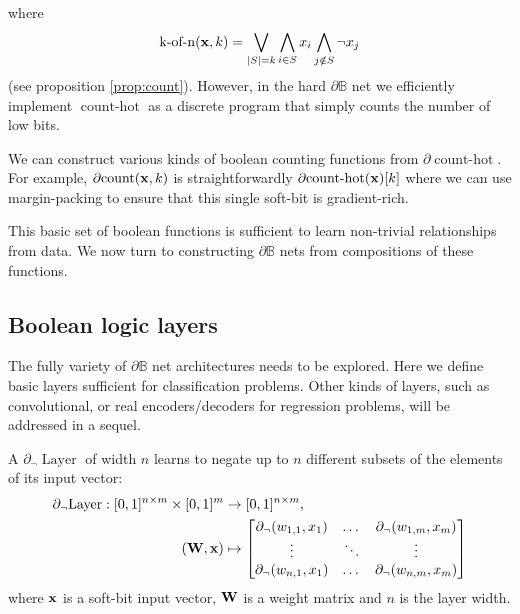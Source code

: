 \documentclass{article} %
\begin{document}
where
\begin{equation*}
\operatorname{k-of-n}({\bf x}, k) = \bigvee_{|S|=k} \bigwedge_{i\in S} x_i \bigwedge_{j\notin S} \neg x_j
\end{equation*}
(see proposition \ref{prop:count}). However, in the hard $\partial\mathbb{B}$ net we efficiently implement $\operatorname{count-hot}$ as a discrete program that simply counts the number of low bits.

We can construct various kinds of boolean counting functions from $\partial\!\operatorname{count-hot}$. For example, $\partial\!\operatorname{count}({\bf x}, k)$ is straightforwardly $\partial\!\operatorname{count-hot}({\bf x})[k]$ where we can use margin-packing to ensure that this single soft-bit is gradient-rich.

This basic set of boolean functions is sufficient to learn non-trivial relationships from data. We now turn to constructing $\partial\mathbb{B}$ nets from compositions of these functions.

\subsection{Boolean logic layers}

The fully variety of $\partial\mathbb{B}$ net architectures needs to be explored. Here we define basic layers sufficient for classification problems. Other kinds of layers, such as convolutional, or real encoders/decoders for regression problems, will be addressed in a sequel.

A $\partial_{\neg} \!\operatorname{Layer}$ of width $n$ learns to negate up to $n$ different subsets of the elements of its input vector:
\begin{equation*}
\begin{aligned}
\partial_{\neg} \!\operatorname{Layer}: [0,1]^{n \times m} \times [0,1]^{m} &\to [0,1]^{n \times m}, \\
({\bf W}, {\bf x}) &\mapsto 
\begin{bmatrix}
\partial_{\neg}(w_{1,1}, x_{1}) & \dots & \partial_{\neg}(w_{1,m}, x_{m}) \\
\vdots & \ddots & \vdots \\
\partial_{\neg}(w_{n,1}, x_{1}) & \dots & \partial_{\neg}(w_{n,m}, x_{m})
\end{bmatrix}
\end{aligned}
\end{equation*}
where ${\bf x}$ is a soft-bit input vector, ${\bf W}$ is a weight matrix and $n$ is the layer width.
\end{document}
